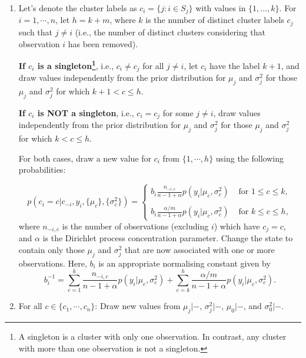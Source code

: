 \documentclass{article}
\begin{document}
\begin{enumerate}
    \item Let's denote the cluster labels as $c_{i} = \{ j: i \in S_{j}\}$ with values in $\{1, ..., k\}$. For $i = 1, \cdots, n$, let $h = k+m$, where $k$ is the number of distinct cluster labels $c_{j}$ such that $j \ne i$ (i.e., the number of distinct clusters considering that observation $i$ has been removed).
    
    \textbf{If $c_{i}$ is a singleton\footnote{A singleton is a cluster with only one observation. In contrast, any cluster with more than one observation is not a singleton.}}, i.e., $c_{i} \ne c_{j}$ for all $j \ne i$, let $c_{i}$ have the label $k + 1$, and draw values independently from the prior distribution for $\mu_{j}$ and $\sigma^{2}_{j}$ for those $\mu_{j}$ and $\sigma^{2}_{j}$ for which $k + 1 < c \leq h$.
    
    \textbf{If $c_{i}$ is NOT a singleton}, i.e., $c_{i} = c_{j}$ for some $j \ne i$, draw values independently from the prior distribution for $\mu_{j}$ and $\sigma^{2}_{j}$ for those $\mu_{j}$ and $\sigma^{2}_{j}$ for which $k < c \leq h$.
    
    For both cases, draw a new value for $c_{i}$ from $\{1, \cdots, h\}$ using the following probabilities:
    
    \begin{equation}
    p(c_{i} = c | c_{-i}, y_{i}, \{\mu_{c}\}, \{\sigma^{2}_{c}\} ) = 
    \begin{cases}
          b_{i} \frac{n_{-i, c}}{n-1+\alpha} p(y_{i}| \mu_{c}, \sigma^{2}_{c}) & \mbox{ for } 1 \leq c \leq k, \\
          \mbox{} \\
          b_{i} \frac{\alpha/m}{n-1+\alpha} p(y_{i}| \mu_{c}, \sigma^{2}_{c}) & \mbox{ for } k \leq c \leq h,
    \end{cases}
    \end{equation}
    where $n_{-i, c}$ is the number of observations (excluding $i$) which have $c_{j} = c$, and $\alpha$ is the Dirichlet process concentration parameter. Change the state to contain only those $\mu_{j}$ and $\sigma^{2}_{j}$ that are now associated with one or more observations. Here, $b_{i}$ is an appropriate normalising constant given by
    \begin{equation}
        b_{i}^{-1} = \sum_{c = 1}^{k} \frac{n_{-i, c}}{n-1+\alpha} p(y_{i}| \mu_{c}, \sigma^{2}_{c}) + \sum_{c = k}^{h} \frac{\alpha/m}{n-1+\alpha} p(y_{i}| \mu_{c}, \sigma^{2}_{c}).
    \end{equation}
    
    \item For all $c \in \{c_{1}, \cdots, c_{n}\}$: Draw new values from $\mu_{j}| -$, $\sigma^{2}_{j}| - $, $\mu_{0}| -$, and $\sigma^{2}_{0}|-$.
    
\end{enumerate}
\end{document}
